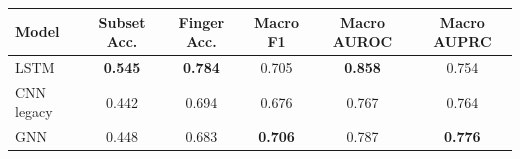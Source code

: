 \begin{tabular}{lccccc}
\toprule
Model & Subset Acc. & Finger Acc. & Macro F1 & Macro AUROC & Macro AUPRC \\
\midrule
LSTM & \textbf{0.545} & \textbf{0.784} & 0.705 & \textbf{0.858} & 0.754 \\
CNN legacy & 0.442 & 0.694 & 0.676 & 0.767 & 0.764 \\
GNN  & 0.448 & 0.683 & \textbf{0.706} & 0.787 & \textbf{0.776} \\
\bottomrule
\end{tabular}
